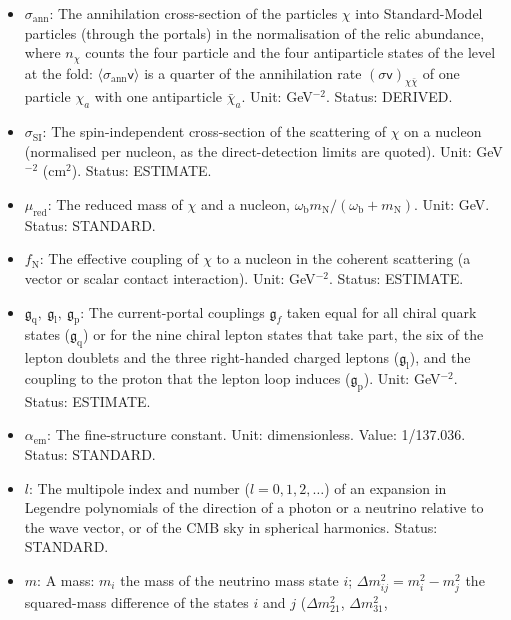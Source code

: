 \documentclass[
  10pt,
]{article}
\begin{document}
\begin{itemize}
  the freeze-out). Unit: dimensionless. Status: STANDARD.
\item
  \(\sigma_{\mathrm{ann}}\): The annihilation cross-section of the
  particles \(\chi\) into Standard-Model particles (through the portals)
  in the normalisation of the relic abundance, where \(n_\chi\) counts
  the four particle and the four antiparticle states of the level at the
  fold: \(\langle\sigma_{\mathrm{ann}}\mathsf{v}\rangle\) is a quarter
  of the annihilation rate \((\sigma\mathsf{v})_{\chi\bar\chi}\) of one
  particle \(\chi_a\) with one antiparticle \(\bar\chi_a\). Unit:
  GeV\(^{-2}\). Status: DERIVED.
\item
  \(\sigma_{\mathrm{SI}}\): The spin-independent cross-section of the
  scattering of \(\chi\) on a nucleon (normalised per nucleon, as the
  direct-detection limits are quoted). Unit: GeV\(^{-2}\) (cm\(^2\)).
  Status: ESTIMATE.
\item
  \(\mu_{\mathrm{red}}\): The reduced mass of \(\chi\) and a nucleon,
  \(\omega_{\mathrm{b}}m_{\mathrm{N}}/(\omega_{\mathrm{b}} + m_{\mathrm{N}})\).
  Unit: GeV. Status: STANDARD.
\item
  \(f_{\mathrm{N}}\): The effective coupling of \(\chi\) to a nucleon in
  the coherent scattering (a vector or scalar contact interaction).
  Unit: GeV\(^{-2}\). Status: ESTIMATE.
\item
  \(\mathfrak{g}_{\mathrm{q}},\ \mathfrak{g}_{\mathrm{l}},\ \mathfrak{g}_{\mathrm{p}}\):
  The current-portal couplings \(\mathfrak{g}_f\) taken equal for all
  chiral quark states (\(\mathfrak{g}_{\mathrm{q}}\)) or for the nine
  chiral lepton states that take part, the six of the lepton doublets
  and the three right-handed charged leptons
  (\(\mathfrak{g}_{\mathrm{l}}\)), and the coupling to the proton that
  the lepton loop induces (\(\mathfrak{g}_{\mathrm{p}}\)). Unit:
  GeV\(^{-2}\). Status: ESTIMATE.
\item
  \(\alpha_{\mathrm{em}}\): The fine-structure constant. Unit:
  dimensionless. Value: 1/137.036. Status: STANDARD.
\item
  \(l\): The multipole index and number (\(l = 0, 1, 2, \dots\)) of an
  expansion in Legendre polynomials of the direction of a photon or a
  neutrino relative to the wave vector, or of the CMB sky in spherical
  harmonics. Status: STANDARD.
\item
  \(m\): A mass: \(m_i\) the mass of the neutrino mass state \(i\);
  \(\Delta m_{ij}^2 = m_i^2 - m_j^2\) the squared-mass difference of the
  states \(i\) and \(j\) (\(\Delta m_{21}^2\), \(\Delta m_{31}^2\),

\end{itemize}
\end{document}
